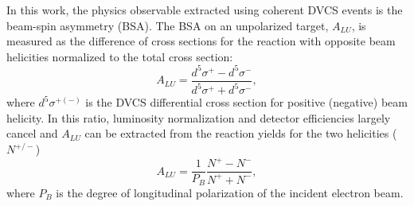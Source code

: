 \documentclass[twocolumn,nofootinbib,showpacs,prl,superscriptaddress,secnumarabic,amssymb,nobibnotes,aps,floatfix]{revtex4}
\begin{document}
In this work, the physics observable extracted using coherent DVCS events is
the beam-spin asymmetry (BSA). The BSA on an unpolarized target, $A_{LU}$, is 
measured as the difference of cross sections for the reaction with opposite beam 
helicities normalized to the total cross section:
  \begin{equation}
  A_{LU} = \frac{d^{5}\sigma^{+} - d^{5}\sigma^{-} }
                {d^{5}\sigma^{+} + d^{5}\sigma^{-}},
    \label{BSA_equation}
  \end{equation}
where $d^{5}\sigma^{+(-)}$ is the DVCS differential cross 
section for positive (negative) beam helicity. 
In this ratio, luminosity normalization and
detector efficiencies largely cancel and $A_{LU}$ can be 
extracted from the reaction yields for the two helicities ($N^{+/-}$)
\begin{equation}
A_{LU} = \frac{1}{P_{B}} \frac{N^{+} - N^{-}}{N^{+} + N^{-} },
\end{equation}
where $P_{B}$ is the degree of longitudinal polarization of the incident electron beam.
\end{document}
